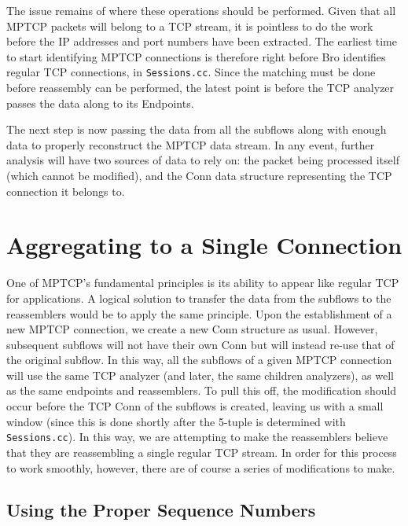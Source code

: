 The issue remains of where these operations should be performed. Given that all MPTCP packets will belong to a TCP stream, it is pointless to do the work before the IP addresses and port numbers have been extracted. The earliest time to start identifying MPTCP connections is therefore right before Bro identifies regular TCP connections, in \texttt{Sessions.cc}. Since the matching must be done before reassembly can be performed, the latest point is before the TCP analyzer passes the data along to its Endpoints.

The next step is now passing the data from all the subflows along with enough data to properly reconstruct the MPTCP data stream. In any event, further analysis will have two sources of data to rely on: the packet being processed itself (which cannot be modified), and the Conn data structure representing the TCP connection it belongs to.

\section{Aggregating to a Single Connection}

One of MPTCP's fundamental principles is its ability to appear like regular TCP for applications. A logical solution to transfer the data from the subflows to the reassemblers would be to apply the same principle. Upon the establishment of a new MPTCP connection, we create a new Conn structure as usual. However, subsequent subflows will not have their own Conn but will instead re-use that of the original subflow. In this way, all the subflows of a given MPTCP connection will use the same TCP analyzer (and later, the same children analyzers), as well as the same endpoints and reassemblers. To pull this off, the modification should occur before the TCP Conn of the subflows is created, leaving us with a small window (since this is done shortly after the 5-tuple is determined with \texttt{Sessions.cc}). In this way, we are attempting to make the reassemblers believe that they are reassembling a single regular TCP stream. In order for this process to work smoothly, however, there are of course a series of modifications to make. \\

\subsection{Using the Proper Sequence Numbers}

